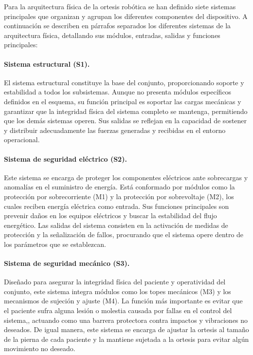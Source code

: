 Para la arquitectura física de la ortesis robótica se han definido siete sistemas principales que organizan y agrupan los diferentes componentes del dispositivo. A continuación se describen en párrafos separados los diferentes sistemas de la arquitectura física, detallando sus módulos, entradas, salidas y funciones principales:

\paragraph*{Sistema estructural (S1).} 
El sistema estructural constituye la base del conjunto, proporcionando soporte y estabilidad a todos los subsistemas. Aunque no presenta módulos específicos definidos en el esquema, su función principal es soportar las cargas mecánicas y garantizar que la integridad física del sistema completo se mantenga, permitiendo que los demás sistemas operen. Sus salidas se reflejan en la capacidad de sostener y distribuir adecuadamente las fuerzas generadas y recibidas en el entorno operacional.

\paragraph*{Sistema de seguridad eléctrico (S2).}  
Este sistema se encarga de proteger los componentes eléctricos ante sobrecargas y anomalías en el suministro de energía. Está conformado por módulos como la protección por sobrecorriente (M1) y la protección por sobrevoltaje (M2), los cuales reciben energía eléctrica como entrada. Sus funciones principales son prevenir daños en los equipos eléctricos y buscar la estabilidad del flujo energético. Las salidas del sistema consisten en la activación de medidas de protección y la señalización de fallos, procurando que el sistema opere dentro de los parámetros que se establezcan.

\paragraph*{Sistema de seguridad mecánico (S3).}  
Diseñado para asegurar la integridad física del paciente y operatividad del conjunto, este sistema integra módulos como los topes mecánicos (M3) y los mecanismos de sujeción y ajuste (M4). La función más importante es evitar que el paciente sufra alguna lesión o molestia causada por fallas en el control del sistema,, actuando como una barrera protectora contra impactos y vibraciones no deseados. De igual manera, este sistema se encarga de ajustar la ortesis al tamaño de la pierna de cada paciente y la mantiene sujetada a la ortesis para evitar algún movimiento no deseado.

